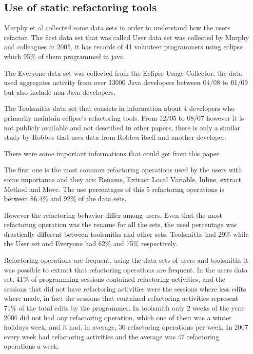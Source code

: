 
\subsection{Use of static refactoring tools}

Murphy et al \cite{murphy2012we} collected some data sets in order to understand how the users refactor.
The first data set that was called User data set was collected by Murphy and colleagues \cite{murphy2006java} in 2005, it has records of 41 volunteer programmers using eclipse which 95\% of them programmed in java. %

The Everyone data set was collected from the Eclipse Usage Collector, the data used aggregates activity from over 13000 Java developers between 04/08 to 01/09 but also include non-Java developers.

The Toolsmiths data set that consists in information about 4 developers who primarily maintain eclipse's refactoring tools. From 12/05 to 08/07 however it is not publicly available and not described in other papers, there is only a similar study by Robbes \cite{robbes2007mining} that uses data from Robbes itself and another developer. 


There were some important informations that could get from this paper.

The first one is the most common refactoring operations used by the users with some importance and they are: Rename, Extract Local Variable, Inline, extract Method and Move. The use percentages of this 5 refactoring operations is between 86.4\% and 92\% of the data sets. %

However the refactoring behavior differ among users. Even that the most refactoring operation was the rename for all the sets, the used percentage was drastically different between toolsmiths and other sets. Toolsmiths had 29\% while the User set and Everyone had 62\% and 75\% respectively.

Refactoring operations are frequent, using the data sets of users and toolsmiths it was possible to extract that refactoring operations are frequent. In the users data set, 41\% of programming sessions contained refactoring activities, and the sessions that did not have refactoring activities were the sessions where less edits where made, in fact the sessions that contained refactoring activities represent 71\% of the total edits by the programmer.
In toolsmith only 2 weeks of the year 2006 did not had any refactoring operation, which one of them was a winter holidays week, and it had, in average, 30 refactoring operations per week. In 2007 every week had refactoring activities and the average was 47 refactoring operations a week.


